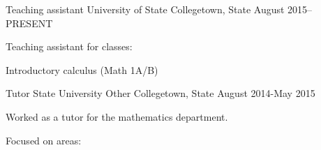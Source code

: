 

\begin{cventries}

  \cventry
    {Teaching assistant} %
    {University of State} %
    {Collegetown, State} %
    {August 2015--PRESENT} %
    {
      \begin{cvitems} %
        \item {Teaching assistant for classes:}
        \item {Introductory calculus (Math 1A/B)}
      \end{cvitems}
    }

  \cventry
    {Tutor} %
    {State University} %
    {Other Collegetown, State} %
    {August 2014-May 2015} %
    {
      \begin{cvitems} %
        \item {Worked as a tutor for the mathematics department.}
        \item {Focused on areas:}
      \end{cvitems}
    }

\end{cventries}
